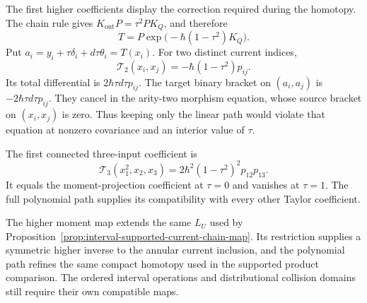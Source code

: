 The first higher coefficients display the correction required during
the homotopy.  The chain rule gives
$K_{\mathrm{out}}P=\tau^2PK_Q$, and therefore
\[
 T=P\exp\bigl(-\hbar(1-\tau^2)K_Q\bigr).
\]
Put $a_i=y_i+\tau\delta_i+d\tau\theta_i=T(x_i)$.
For two distinct current indices,
\[
 \mathcal T_2(x_i,x_j)=-\hbar(1-\tau^2)p_{ij}.
\]
Its total differential is $2\hbar\tau d\tau p_{ij}$.
The target binary bracket on $(a_i,a_j)$ is
$-2\hbar\tau d\tau p_{ij}$.
They cancel in the arity-two morphism equation, whose source
bracket on $(x_i,x_j)$ is zero.
Thus keeping only the linear path would violate that equation at
nonzero covariance and an interior value of $\tau$.

The first connected three-input coefficient is
\[
 \mathcal T_3(x_1^2,x_2,x_3)
       =2\hbar^2(1-\tau^2)^2p_{12}p_{13}.
\]
It equals the moment-projection coefficient at $\tau=0$ and
vanishes at $\tau=1$.  The full polynomial path supplies its
compatibility with every other Taylor coefficient.

The higher moment map extends the same $L_U$ used by
Proposition~\ref{prop:interval-supported-current-chain-map}.
Its restriction supplies a symmetric higher inverse to the annular
current inclusion, and the polynomial path refines the same compact
homotopy used in the supported product comparison.
The ordered interval operations and distributional collision domains
still require their own compatible maps.

